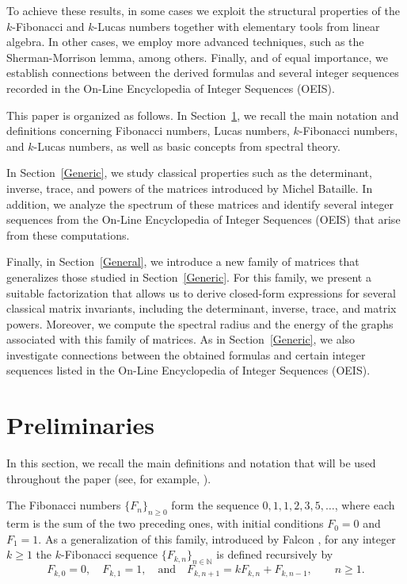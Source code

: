 \documentclass[11pt]{birkjour}
\theoremstyle{definition}
\theoremstyle{remark}
\numberwithin{equation}{section}
\begin{document}
\noindent
To achieve these results, in some cases we exploit the structural properties of the $k$-Fibonacci and $k$-Lucas numbers together with elementary tools from linear algebra. In other cases, we employ more advanced techniques, such as the Sherman-Morrison lemma, among others. Finally, and of equal importance, we establish connections between the derived formulas and several integer sequences recorded in the On-Line Encyclopedia of Integer Sequences (OEIS).
\par\smallskip

\noindent
This paper is organized as follows. In Section~\ref{preliminaries}, we recall the main notation and definitions concerning Fibonacci numbers, Lucas numbers, $k$-Fibonacci numbers, and $k$-Lucas numbers, as well as basic concepts from spectral theory.
\par\smallskip

\noindent
In Section~\ref{Generic}, we study classical properties such as the determinant, inverse, trace, and powers of the matrices introduced by Michel Bataille. In addition, we analyze the spectrum of these matrices and identify several integer sequences from the On-Line Encyclopedia of Integer Sequences (OEIS) that arise from these computations.
\par\smallskip

\noindent
Finally, in Section~\ref{General}, we introduce a new family of matrices that generalizes those studied in Section~\ref{Generic}. For this family, we present a suitable factorization that allows us to derive closed-form expressions for several classical matrix invariants, including the determinant, inverse, trace, and matrix powers. Moreover, we compute the spectral radius and the energy of the graphs associated with this family of matrices. As in Section~\ref{Generic}, we also investigate connections between the obtained formulas and certain integer sequences listed in the On-Line Encyclopedia of Integer Sequences (OEIS).




\section{Preliminaries}\label{preliminaries}
In this section, we recall the main definitions and notation that will be used throughout the paper (see, for example, \cite{koshy,Falcon2011,FalconPlaza2007,FalconPlaza2009}).
\par\smallskip

\noindent
The Fibonacci numbers $\{F_n\}_{n\geq 0}$ form the sequence $0,1,1,2,3,5,\ldots$, where each term is the sum of the two preceding ones, with initial conditions $F_0=0$ and $F_1=1$. As a generalization of this family, introduced by Falcon \cite{Falcon2011}, for any integer $k\geq 1$ the $k$-Fibonacci sequence $\{F_{k,n}\}_{n\in\mathbb{N}}$ is defined recursively by
\[
F_{k,0}=0,\quad F_{k,1}=1,\quad \text{and}\quad F_{k,n+1}=kF_{k,n}+F_{k,n-1},\qquad n\geq 1.
\]
\end{document}
